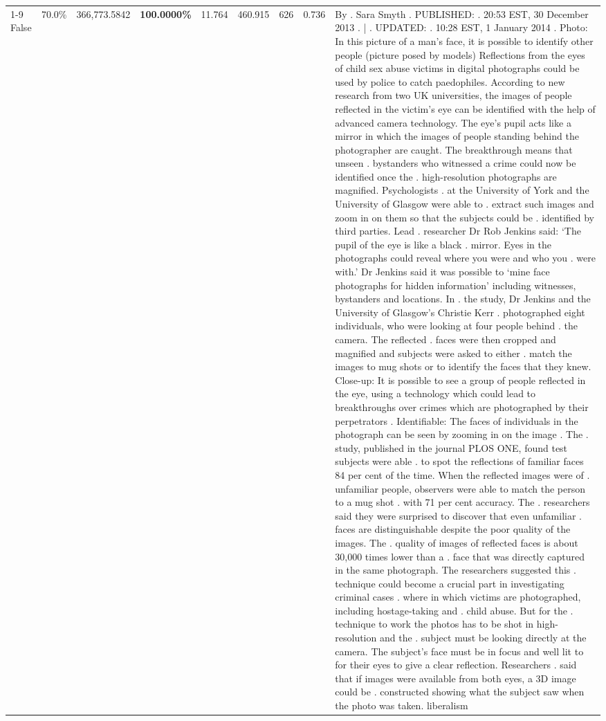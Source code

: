 \begin{table}[H]
\begin{tabular}{lllrlllll}
\cline{1-9}
False & 70.0\% & 366,773.5842 & \bfseries \color{red} 100.0000\% & 11.764 & 460.915 & 626 & 0.736 & By . Sara Smyth . PUBLISHED: . 20:53 EST, 30 December 2013 . | . UPDATED: . 10:28 EST, 1 January 2014 . Photo: In this picture of a man's face, it is possible to identify other people (picture posed by models) Reflections from the eyes of child sex abuse victims in digital photographs could be used by police to catch paedophiles. According to new research from two UK universities, the images of people reflected in the victim's eye can be identified with the help of advanced camera technology. The eye's pupil acts like a mirror in which the images of people standing behind the photographer are caught. The breakthrough means that unseen . bystanders who witnessed a crime could now be identified once the . high-resolution photographs are magnified. Psychologists . at the University of York and the University of Glasgow were able to . extract such images and zoom in on them so that the subjects could be . identified by third parties. Lead . researcher Dr Rob Jenkins said: ‘The pupil of the eye is like a black . mirror. Eyes in the photographs could reveal where you were and who you . were with.' Dr Jenkins said it was possible to ‘mine face photographs for hidden information' including witnesses, bystanders and locations. In . the study, Dr Jenkins and the University of Glasgow's Christie Kerr . photographed eight individuals, who were looking at four people behind . the camera. The reflected . faces were then cropped and magnified and subjects were asked to either . match the images to mug shots or to identify the faces that they knew. Close-up: It is possible to see a group of people reflected in the eye, using a technology which could lead to breakthroughs over crimes which are photographed by their perpetrators . Identifiable: The faces of individuals in the photograph can be seen by zooming in on the image . The . study, published in the journal PLOS ONE, found test subjects were able . to spot the reflections of familiar faces 84 per cent of the time. When the reflected images were of . unfamiliar people, observers were able to match the person to a mug shot . with 71 per cent accuracy. The . researchers said they were surprised to discover that even unfamiliar . faces are distinguishable despite the poor quality of the images. The . quality of images of reflected faces is about 30,000 times lower than a . face that was directly captured in the same photograph. The researchers suggested this . technique could become a crucial part in investigating criminal cases . where in which victims are photographed, including hostage-taking and . child abuse. But for the . technique to work the photos has to be shot in high-resolution and the . subject must be looking directly at the camera. The subject's face must be in focus and well lit to for their eyes to give a clear reflection. Researchers . said that if images were available from both eyes, a 3D image could be . constructed showing what the subject saw when the photo was taken. liberalism \\

\end{tabular}
\end{table}
